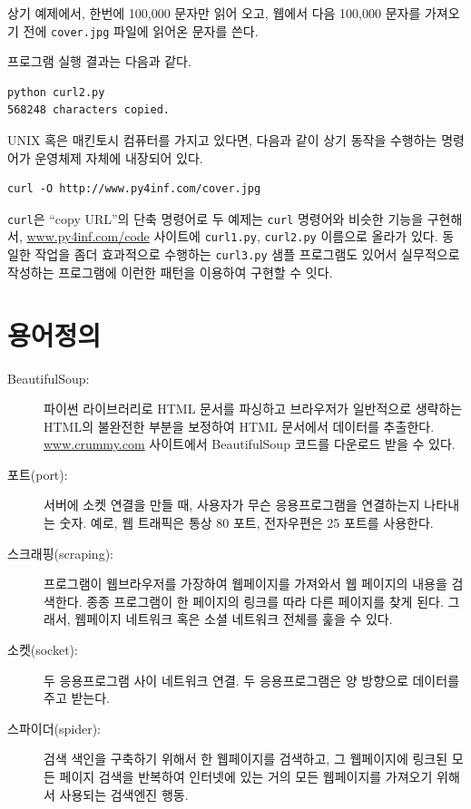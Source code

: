 상기 예제에서, 한번에 100,000 문자만 읽어 오고, 웹에서 다음 100,000 문자를 가져오기 전에 {\tt cover.jpg} 파일에 읽어온 문자를 쓴다.

프로그램 실행 결과는 다음과 같다.

\beforeverb
\begin{verbatim}
python curl2.py 
568248 characters copied.
\end{verbatim}
\afterverb
%

UNIX 혹은 매킨토시 컴퓨터를 가지고 있다면, 다음과 같이 상기 동작을 수행하는 명령어가 운영체제 자체에 내장되어 있다.


\beforeverb
\begin{verbatim}
curl -O http://www.py4inf.com/cover.jpg
\end{verbatim}
\afterverb
%

{\tt curl}은 ``copy URL''의 단축 명령어로 두 예제는 {\tt curl} 명령어와 비슷한 기능을 구현해서, 
\url{www.py4inf.com/code} 사이트에 {\tt curl1.py}, {\tt curl2.py} 이름으로 올라가 있다.
동일한 작업을 좀더 효과적으로 수행하는 {\tt curl3.py} 샘플 프로그램도 있어서 실무적으로 작성하는 프로그램에 이런한 패턴을 이용하여 구현할 수 잇다.

\section{용어정의}

\begin{description}

\item[BeautifulSoup:] 파이썬 라이브러리로 HTML 문서를 파싱하고 
브라우저가 일반적으로 생략하는 HTML의 불완전한 부분을 보정하여 HTML 문서에서 데이터를 추출한다.
\url{www.crummy.com} 사이트에서 BeautifulSoup 코드를 다운로드 받을 수 있다.

\item[포트(port):] 서버에 소켓 연결을 만들 때, 사용자가 무슨 응용프로그램을 연결하는지 나타내는 숫자.
예로, 웹 트래픽은 통상 80 포트, 전자우편은 25 포트를 사용한다.

\item[스크래핑(scraping):] 프로그램이 웹브라우저를 가장하여 웹페이지를 가져와서 웹 페이지의 내용을 검색한다.
종종 프로그램이 한 페이지의 링크를 따라 다른 페이지를 찾게 된다. 그래서, 웹페이지 네트워크 혹은 소셜 네트워크 전체를 훑을 수 있다.

\item[소켓(socket):] 두 응용프로그램 사이 네트워크 연결. 두 응용프로그램은 양 방향으로 데이터를 주고 받는다.

\item[스파이더(spider):] 검색 색인을 구축하기 위해서 한 웹페이지를 검색하고, 그 웹페이지에 링크된 모든 페이지 검색을 반복하여
인터넷에 있는 거의 모든 웹페이지를 가져오기 위해서 사용되는 검색엔진 행동.

\end{description}

